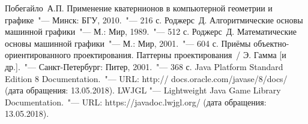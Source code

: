 \renewcommand{\bibname}{Список использованных источников}
\begin{thebibliography}{99}
 Побегайло~А.П. Применение кватернионов в компьютерной геометрии и графике~"--- Минск: БГУ,
2010.~"--- 216 с.
 Роджерс~Д. Алгоритмические основы машинной графики~"--- М.: Мир, 1989.~"--- 512 с.
 Роджерс~Д. Математические основы машинной графики~"--- М.: Мир, 2001.~"--- 604 с.
 Приёмы объектно-ориентированного проектирования. Паттерны проектирования~/ Э. Гамма [и др.].~"---
Санкт-Петербург: Питер, 2001.~"--- 368 с.
 Java Platform Standard Edition 8 Documentation.~"--- URL: http:// docs.oracle.com/javase/8/docs/
(дата обращения: 13.05.2018).
 LWJGL "--- Lightweight Java Game Library Documentation.~"--- URL: https://javadoc.lwjgl.org/
(дата обращения: 13.05.2018).
\end{thebibliography}
